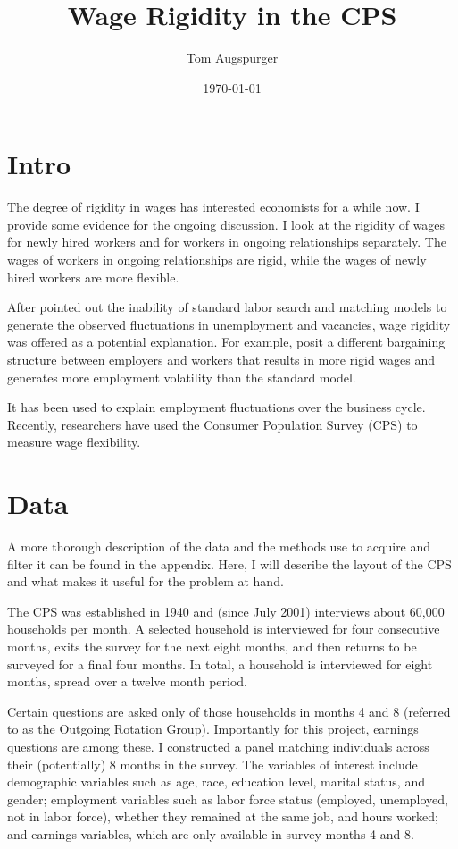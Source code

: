 \documentclass[11pt]{article}
\title{Wage Rigidity in the CPS}
\author{Tom Augspurger}
\date{\today}
\begin{document}
\maketitle

\section{Intro}
\label{sec:intro}

The degree of rigidity in wages has interested economists for a while now.
I provide some evidence for the ongoing discussion.
I look at the rigidity of wages for newly hired workers and for workers in ongoing relationships separately.
The wages of workers in ongoing relationships are rigid, while the wages of newly hired workers are more flexible.

After \cite{shimer_2005} pointed out the inability of standard labor search and matching models to generate the observed fluctuations in unemployment and vacancies, wage rigidity was offered as a potential explanation.
For example, \cite{hall_milgrom_2008} posit a different bargaining structure between employers and workers that results in more rigid wages and generates more employment volatility than the standard model.

It has been used to explain employment fluctuations over the business cycle.
Recently, researchers have used the Consumer Population Survey (CPS) to measure wage flexibility.

\section{Data}
\label{sec:section_name}

A more thorough description of the data and the methods use to acquire and filter it can be found in the appendix.
Here, I will describe the layout of the CPS and what makes it useful for the problem at hand.

The CPS was established in 1940 and (since July 2001) interviews about 60,000 households per month.
A selected household is interviewed for four consecutive months, exits the survey for the next
eight months, and then returns to be surveyed for a final four months.
In total, a household is interviewed for eight months, spread over a twelve month period.

Certain questions are asked only of those households in months 4 and 8 (referred to as the Outgoing Rotation Group).
Importantly for this project, earnings questions are among these.
I constructed a panel matching individuals across their (potentially) 8 months in the survey.
The variables of interest include demographic variables such as age, race, education level, marital status, and gender;
employment variables such as labor force status (employed, unemployed, not in labor force), whether they remained at the same job, and hours worked;
and earnings variables, which are only available in survey months 4 and 8.
\end{document}

